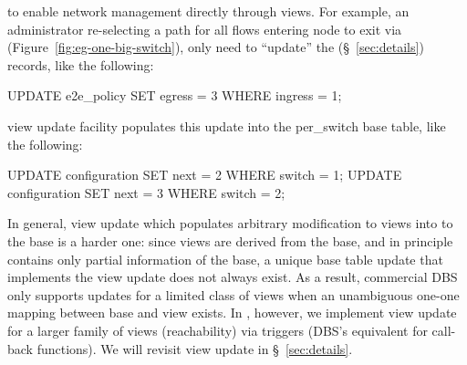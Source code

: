  to enable network management directly
through views. For example, an administrator re-selecting a path for
all flows entering node  to exit via 
(Figure~\ref{fig:eg-one-big-switch}), only need to ``update'' the
 (\S~\ref{sec:details}) records, like the
following:
\begin{sql}
UPDATE e2e_policy SET egress = 3 WHERE ingress = 1;
\end{sql}
\Sys view update facility populates this update into the per\_switch  base table, like the following:
\begin{sql}
UPDATE configuration SET next = 2 WHERE switch = 1;
UPDATE configuration SET next = 3 WHERE switch = 2;
\end{sql}
In general, view update which populates arbitrary modification to
views into to the base is a harder one: since views are derived from
the base, and in principle contains only partial information of the
base, a unique base table update that implements the view update does
not always exist. As a result, commercial DBS only supports updates
for a limited class of views when an unambiguous one-one mapping
between base and view exists.  In \Sys, however, we implement view
update for a larger family of views (\eg reachability) via triggers
(DBS's equivalent for call-back functions). We will revisit view
update in \S~\ref{sec:details}.
